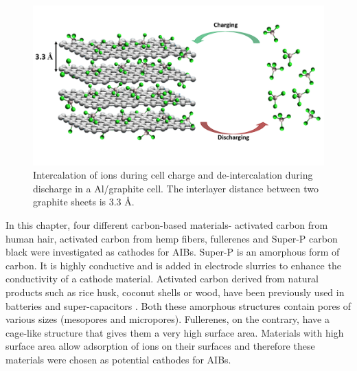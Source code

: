 

 \begin{figure}[h]
  \centering
  \includegraphics[width=\textwidth]{Figures/chap5fig/graphmech}
    \caption{Intercalation of  ions during cell charge and de-intercalation during discharge in a Al/graphite cell. The interlayer distance between two graphite sheets is 3.3 \AA.}
  \label{Figures/chap5fig:graphmech}
\end{figure}

In this chapter, four different carbon-based materials- activated carbon from human hair, activated carbon from hemp fibers, fullerenes and Super-P carbon black were investigated as cathodes for AIBs. Super-P is an amorphous form of carbon. It is highly conductive and is added in electrode slurries to enhance the conductivity of a cathode material. Activated carbon derived from natural products such as rice husk, coconut shells or wood, have been previously used in batteries and super-capacitors \cite{hussain_development_2019, frackowiak_carbon_2001}. Both these amorphous structures contain pores of various sizes (mesopores and micropores). Fullerenes, on the contrary, have a cage-like structure that gives them a very high surface area. Materials with high surface area allow adsorption of ions on their surfaces and therefore these materials were chosen as potential cathodes for AIBs.   

